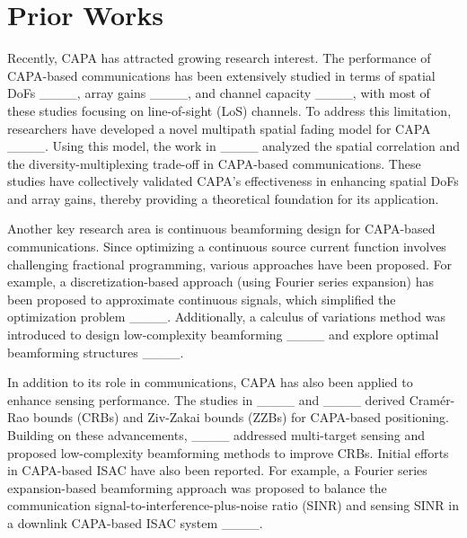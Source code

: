 \section{Prior Works}
\label{Section: Prior Works}
Recently, CAPA has attracted growing research interest. The performance of CAPA-based communications has been extensively studied in terms of spatial DoFs ____, array gains ____, and channel capacity ____, with most of these studies focusing on line-of-sight (LoS) channels. To address this limitation, researchers have developed a novel multipath spatial fading model for CAPA ____. Using this model, the work in ____ analyzed the spatial correlation and the diversity-multiplexing trade-off in CAPA-based communications. These studies have collectively validated CAPA's effectiveness in enhancing spatial DoFs and array gains, thereby providing a theoretical foundation for its application.

Another key research area is continuous beamforming design for CAPA-based communications. Since optimizing a continuous source current function involves challenging fractional programming, various approaches have been proposed. For example, a discretization-based approach (using Fourier series expansion) has been proposed to approximate continuous signals, which simplified the optimization problem ____. Additionally, a calculus of variations method was introduced to design low-complexity beamforming ____ and explore optimal beamforming structures ____.

In addition to its role in communications, CAPA has also been applied to enhance sensing performance. The studies in ____ and ____ derived Cram{\'e}r-Rao bounds (CRBs) and Ziv-Zakai bounds (ZZBs) for CAPA-based positioning. Building on these advancements, ____ addressed multi-target sensing and proposed low-complexity beamforming methods to improve CRBs. Initial efforts in CAPA-based ISAC have also been reported. For example, a Fourier series expansion-based beamforming approach was proposed to balance the communication signal-to-interference-plus-noise ratio (SINR) and sensing SINR in a downlink CAPA-based ISAC system ____.